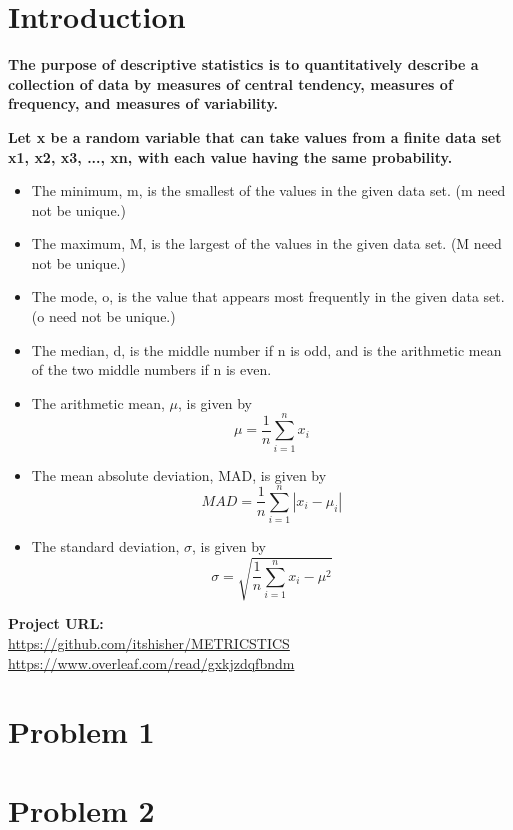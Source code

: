 \documentclass[letterpaper]{report}
\begin{document}
\chapter*{Introduction}
\textbf{The purpose of descriptive statistics is to quantitatively describe a collection of data by measures of central tendency, measures of frequency, and measures of variability.  
}
\hfill \break

\noindent\textbf{Let x be a random variable that can take values from a finite data set x1, x2, x3, ..., xn, with each value having the same probability. }

\begin{itemize}
    \item The minimum, m, is the smallest of the values in the given data set. (m need not be unique.)  
    \item The maximum, M, is the largest of the values in the given data set. (M need not be unique.) 
    \item The mode, o, is the value that appears most frequently in the given data set. (o need not be unique.) 
    \item The median, d, is the middle number if n is odd, and is the arithmetic mean of the two middle numbers if n is even.
    \item The arithmetic mean, $\mu$, is given by \[\mu = \frac{1}{n} \sum^{n}_{i=1} x_i\]
    \item The mean absolute deviation, MAD, is given by
    \[MAD = \frac{1}{n} \sum^{n}_{i=1} |x_i - \mu_i|\]
    \item The standard deviation, $\sigma$, is given by 
    \[\sigma = \sqrt{\frac{1}{n} \sum^{n}_{i=1} x_i - \mu^2}\]
\end{itemize} 

\noindent \textbf{Project URL:} \\
\href{https://github.com/itshisher/METRICSTICS}{}\url{https://github.com/itshisher/METRICSTICS}\\
\href{https://github.com/itshisher/METRICSTICS}{}\url{https://www.overleaf.com/read/gxkjzdqfbndm}


\chapter{Problem 1}


\chapter{Problem 2}

\end{document}
